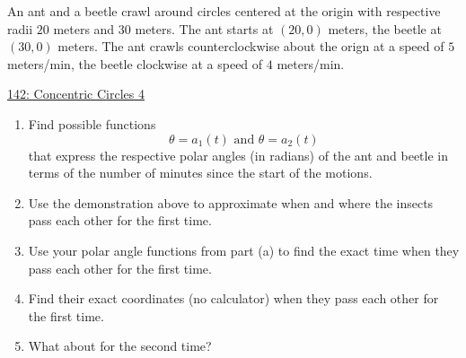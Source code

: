 \documentclass{ximera}
\begin{document}
\begin{question} \label{Q43fg4tggfr}
An ant and a beetle crawl around circles centered at the origin with respective radii $20$ meters and $30$ meters.  The ant starts at $(20,0)$ meters, the beetle at $(30,0)$ meters. The ant crawls counterclockwise about the orign at a speed of $5$ meters/min, the beetle clockwise at a speed of $4$ meters/min. 

\begin{onlineOnly}
    \begin{center}
\end{center}
\end{onlineOnly}

\href{https://www.desmos.com/calculator/ie75j2a9ky}{142: Concentric Circles 4}

\begin{enumerate}

\item Find possible functions
\[
   \theta = a_1(t) \text{ and } \theta = a_2(t)
\]
that express the respective polar angles (in radians) of the ant and beetle in terms of the number of minutes since the start of the motions.

\item Use the demonstration above to approximate when and where the insects pass each other for the first time.

\item Use your polar angle functions from part (a) to find the exact time when they pass each other for the first time.


\item Find their exact coordinates (no calculator) when they pass each other for the first time.

\item What about for the second time?
\end{enumerate}
\end{question}
\end{document}
